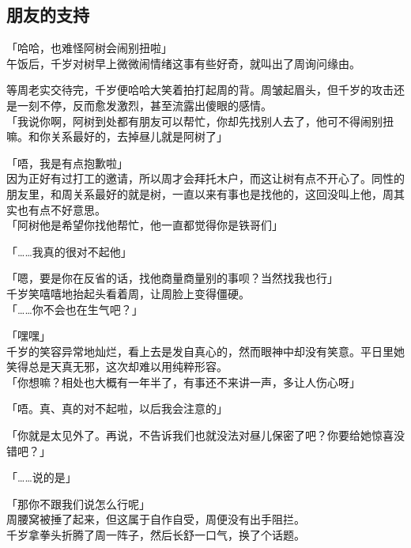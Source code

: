 \subsection{朋友的支持}

「哈哈，也难怪阿树会闹别扭啦」\\

午饭后，千岁对树早上微微闹情绪这事有些好奇，就叫出了周询问缘由。

等周老实交待完，千岁便哈哈大笑着拍打起周的背。周皱起眉头，但千岁的攻击还是一刻不停，反而愈发激烈，甚至流露出傻眼的感情。\\

「我说你啊，阿树到处都有朋友可以帮忙，你却先找别人去了，他可不得闹别扭嘛。和你关系最好的，去掉昼儿就是阿树了」

「唔，我是有点抱歉啦」\\

因为正好有过打工的邀请，所以周才会拜托木户，而这让树有点不开心了。同性的朋友里，和周关系最好的就是树，一直以来有事也是找他的，这回没叫上他，周其实也有点不好意思。\\

「阿树他是希望你找他帮忙，他一直都觉得你是铁哥们」

「……我真的很对不起他」

「嗯，要是你在反省的话，找他商量商量别的事呗？当然找我也行」\\

千岁笑嘻嘻地抬起头看着周，让周脸上变得僵硬。\\

「……你不会也在生气吧？」

「嘿嘿」\\

千岁的笑容异常地灿烂，看上去是发自真心的，然而眼神中却没有笑意。平日里她笑得总是天真无邪，这次却难以用纯粹形容。\\

「你想嘛？相处也大概有一年半了，有事还不来讲一声，多让人伤心呀」

「唔。真、真的对不起啦，以后我会注意的」

「你就是太见外了。再说，不告诉我们也就没法对昼儿保密了吧？你要给她惊喜没错吧？」

「……说的是」

「那你不跟我们说怎么行呢」\\

周腰窝被捶了起来，但这属于自作自受，周便没有出手阻拦。\\

千岁拿拳头折腾了周一阵子，然后长舒一口气，换了个话题。\\

